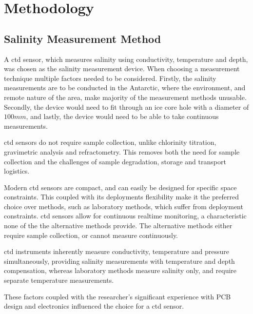 \chapter{Methodology}

\section{Salinity Measurement Method}
A \gls{ctd} sensor, which measures salinity using conductivity, temperature and depth, was chosen as the salinity measurement device.
When choosing a measurement technique multiple factors needed to be considered.
Firstly, the salinity measurements are to be conducted in the Antarctic, where the environment, and remote nature of the area, make majority of the measurement methods unusable.
Secondly, the device would need to fit through an ice core hole with a diameter of $100mm$, and lastly, the device would need to be able to take continuous measurements.

\gls{ctd} sensors do not require sample collection, unlike chlorinity titration, gravimetric analysis and refractometry.
This removes both the need for sample collection and the challenges of sample degradation, storage and transport logistics.

Modern \gls{ctd} sensors are compact, and can easily be designed for specific space constraints.
This coupled with its deployments flexibility make it the preferred choice over methods, such as laboratory methods, which suffer from deployment constraints.
\gls{ctd} sensors allow for continuous realtime monitoring, a characteristic none of the the alternative methods provide.
The alternative methods either require sample collection, or cannot measure continuously.

\gls{ctd} instruments inherently measure conductivity, temperature and pressure simultaneously, providing salinity measurements with temperature and depth compensation, whereas laboratory methods measure salinity only, and require separate temperature measurements.


These factors coupled with the researcher's significant experience with PCB design and electronics influenced the choice for a \gls{ctd} sensor.

